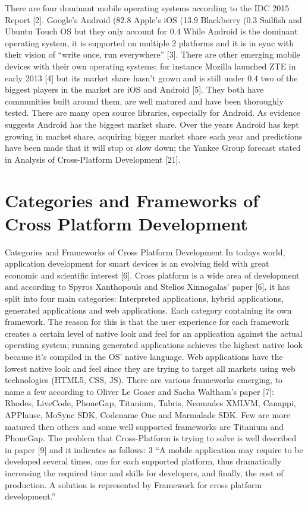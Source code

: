 There are four dominant mobile operating systems according to the IDC
2015 Report [2]. Google’s Android (82.8%
Apple’s iOS (13.9%
Blackberry (0.3%
Sailfish and Ubuntu Touch OS but they only account for 0.4%
While Android is the dominant operating system, it is supported on multiple
2
platforms and it is in sync with their vision of “write once, run everywhere”
[3].
There are other emerging mobile devices with their own operating systems;
for instance Mozilla launched ZTE in early 2013 [4] but its market share
hasn’t grown and is still under 0.4%
two of the biggest players in the market are iOS and Android [5]. They both
have communities built around them, are well matured and have been
thoroughly tested. There are many open source libraries, especially for
Android. As evidence suggests Android has the biggest market share. Over
the years Android has kept growing in market share, acquiring bigger market
share each year and predictions have been made that it will stop or slow
down; the Yankee Group forecast stated in Analysis of Cross-Platform
Development [21].

\section{Categories and Frameworks of Cross Platform Development}

Categories and Frameworks of Cross Platform Development
In todays world, application development for smart devices is an evolving
field with great economic and scientific interest [6]. Cross platform is a wide
area of development and according to Spyros Xanthopouls and Stelios
Xinnogalas’ paper [6], it has split into four main categories: Interpreted
applications, hybrid applications, generated applications and web
applications. Each category containing its own framework. The reason for
this is that the user experience for each framework creates a certain level of
native look and feel for an application against the actual operating system;
running generated applications achieves the highest native look because it’s
compiled in the OS’ native language. Web applications have the lowest native
look and feel since they are trying to target all markets using web
technologies (HTML5, CSS, JS). There are various frameworks emerging, to
name a few according to Oliver Le Goaer and Sacha Waltham’s paper [7]:
Rhodes, LiveCode, PhoneGap, Titanium, Tabris, Neomades XMLVM, Canappi,
APPlause, MoSync SDK, Codename One and Marmalade SDK. Few are more
matured then others and some well supported frameworks are Titanium and
PhoneGap. The problem that Cross-Platform is trying to solve is well
described in paper [9] and it indicates as follows:
3
“A mobile application may require to be developed several times,
one for each supported platform, thus dramatically increasing
the required time and skills for developers, and finally, the cost
of production. A solution is represented by Framework for cross
platform development.”

